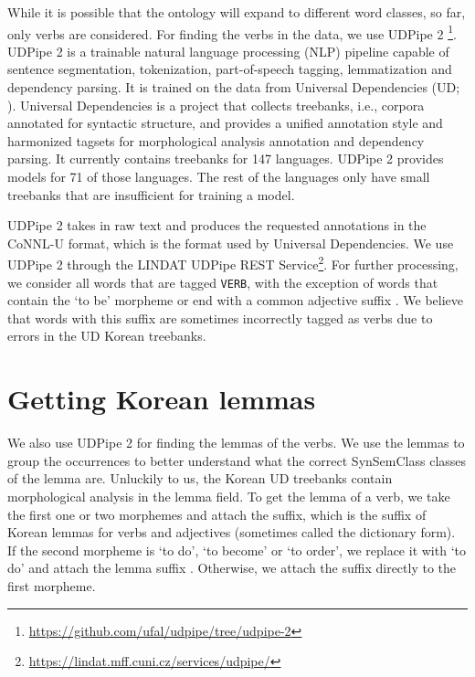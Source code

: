 While it is possible that the ontology will expand to different word classes, so far, only verbs are considered. For finding the verbs in the data, we use UDPipe 2 \parencite{straka-2018-udpipe}\footnote{\url{https://github.com/ufal/udpipe/tree/udpipe-2}}. UDPipe 2 is a trainable natural language processing (NLP) pipeline capable of sentence segmentation, tokenization, part-of-speech tagging, lemmatization and dependency parsing. It is trained on the data from Universal Dependencies (UD; \cite{nivre2016universal}). Universal Dependencies is a project that collects treebanks, i.e., corpora annotated for syntactic structure, and provides a unified annotation style and harmonized tagsets for morphological analysis annotation and dependency parsing. It currently contains treebanks for 147 languages. UDPipe 2 provides models for 71 of those languages. The rest of the languages only have small treebanks that are insufficient for training a model.

UDPipe 2 takes in raw text and produces the requested annotations in the CoNNL-U format, which is the format used by Universal Dependencies. We use UDPipe 2 through the LINDAT UDPipe REST Service\footnote{\url{https://lindat.mff.cuni.cz/services/udpipe/}}. For further processing, we consider all words that are tagged \texttt{VERB}, with the exception of words that contain the `to be'  morpheme or end with a common adjective suffix . We believe that words with this suffix are sometimes incorrectly tagged as verbs due to errors in the UD Korean treebanks. 

\section{Getting Korean lemmas}

We also use UDPipe 2 for finding the lemmas of the verbs. We use the lemmas to group the occurrences to better understand what the correct SynSemClass classes of the lemma are. Unluckily to us, the Korean UD treebanks contain morphological analysis in the lemma field. To get the lemma of a verb, we take the first one or two morphemes and attach the  suffix, which is the suffix of Korean lemmas for verbs and adjectives (sometimes called the dictionary form). If the second morpheme is  `to do',  `to become' or  `to order', we replace it with  `to do' and attach the lemma suffix . Otherwise, we attach the  suffix directly to the first morpheme.

